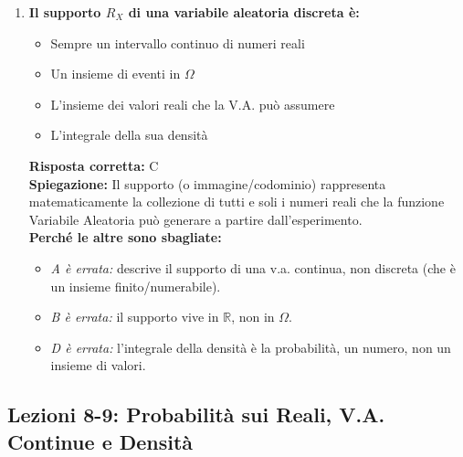 \documentclass[12pt, a4paper]{article}
\begin{document}
\begin{enumerate}[label=\textbf{\arabic*.}]
    \item \textbf{Il supporto $R_X$ di una variabile aleatoria discreta è:}
    \begin{itemize}
        \item[A)] Sempre un intervallo continuo di numeri reali
        \item[B)] Un insieme di eventi in $\Omega$
        \item[C)] L'insieme dei valori reali che la V.A. può assumere
        \item[D)] L'integrale della sua densità
    \end{itemize}
    \textbf{Risposta corretta:} C \\
    \textbf{Spiegazione:} Il supporto (o immagine/codominio) rappresenta matematicamente la collezione di tutti e soli i numeri reali che la funzione Variabile Aleatoria può generare a partire dall'esperimento. \\
    \textbf{Perché le altre sono sbagliate:}
    \begin{itemize}
        \item \textit{A è errata:} descrive il supporto di una v.a. continua, non discreta (che è un insieme finito/numerabile).
        \item \textit{B è errata:} il supporto vive in $\mathbb{R}$, non in $\Omega$.
        \item \textit{D è errata:} l'integrale della densità è la probabilità, un numero, non un insieme di valori.
    \end{itemize}
\end{enumerate}

\subsection*{Lezioni 8-9: Probabilità sui Reali, V.A. Continue e Densità}
\end{document}
